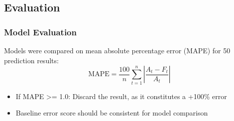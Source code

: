 \documentclass[aspectratio=169,classic]{uva-inf-presentation}
\begin{document}
\subsection{Evaluation}
\begin{frame}
\frametitle{Model Evaluation}
Models were compared on mean absolute percentage error (MAPE) for 50 prediction results:
$$\mbox{MAPE} = \frac{100}{n}\sum_{t=1}^n  \left|\frac{A_t-F_t}{A_t}\right|$$
\begin{itemize}
    \item If MAPE >= 1.0: Discard the result, as it constitutes a +100\% error
    \item Baseline error score should be consistent for model comparison
\end{itemize}

\end{frame}

\twocolumn



\end{document}
